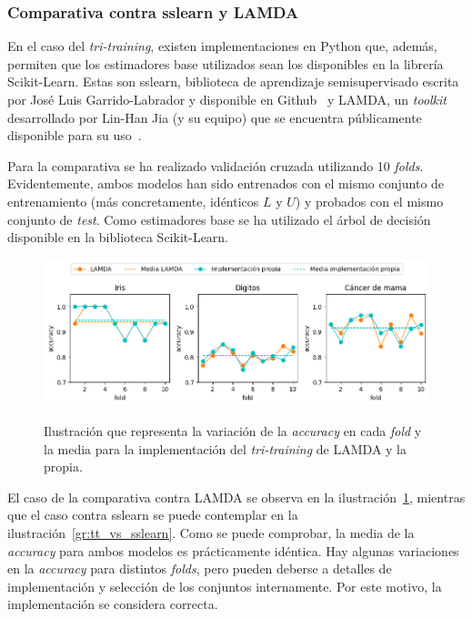\subsubsection{Comparativa contra sslearn y LAMDA}

En el caso del \textit{tri-training}, existen implementaciones en Python que, además, permiten que los estimadores base utilizados sean los disponibles en la librería Scikit-Learn. Estas son sslearn, biblioteca de aprendizaje semisupervisado escrita por José Luis Garrido-Labrador y disponible en Github~\cite{sslearnRepo} y LAMDA, un \textit{toolkit}~\cite{lamdasslPaper} desarrollado por Lin-Han Jia (y su equipo) que se encuentra públicamente disponible para su uso~\cite{lamdasslRepo}.

Para la comparativa se ha realizado validación cruzada utilizando 10 \textit{folds}. Evidentemente, ambos modelos han sido entrenados con el mismo conjunto de entrenamiento (más concretamente, idénticos $L$ y $U$) y probados con el mismo conjunto de \textit{test}. Como estimadores base se ha utilizado el árbol de decisión disponible en la biblioteca Scikit-Learn.

\begin{figure}[h]
	\caption[\textit{Tri-training}: comparativa contra LAMDA]{Ilustración que representa la variación de la \textit{accuracy} en cada \textit{fold} y la media para la implementación del \textit{tri-training} de LAMDA y la propia.}
	\centering
	\includegraphics[width=\textwidth]{../img/memoria/5_tritraining_lamda}
	\label{gr:tt_vs_lamda}
\end{figure}

El caso de la comparativa contra LAMDA se observa en la ilustración~\ref{gr:tt_vs_lamda}, mientras que el caso contra sslearn se puede contemplar en la ilustración~\ref{gr:tt_vs_sslearn}. Como se puede comprobar, la media de la \textit{accuracy} para ambos modelos es prácticamente idéntica. Hay algunas variaciones en la \textit{accuracy} para distintos \textit{folds}, pero pueden deberse a detalles de implementación y selección de los conjuntos internamente. Por este motivo, la implementación se considera correcta.

